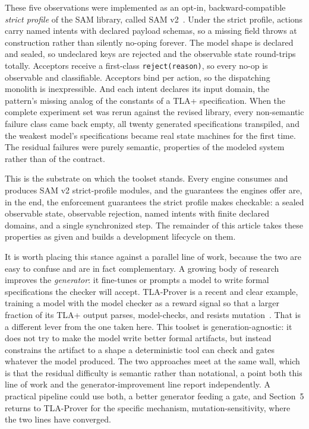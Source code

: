 \documentclass[11pt]{article}
\newcommand{\code}[1]{\texttt{#1}}
\begin{document}
These five observations were implemented as an opt-in, backward-compatible
\emph{strict profile} of the SAM library, called SAM v2~\cite{samv2}. Under
the strict profile, actions carry named intents with declared payload schemas,
so a missing field throws at construction rather than silently no-oping
forever. The model shape is declared and sealed, so undeclared keys are
rejected and the observable state round-trips totally. Acceptors receive a
first-class \code{reject(reason)}, so every no-op is observable and
classifiable. Acceptors bind per action, so the dispatching monolith is
inexpressible. And each intent declares its input domain, the pattern's
missing analog of the constants of a TLA+ specification. When the complete
experiment set was rerun against the revised library, every non-semantic
failure class came back empty, all twenty generated specifications
transpiled, and the weakest model's specifications became real state machines
for the first time. The residual failures were purely semantic, properties of
the modeled system rather than of the contract.

This is the substrate on which the toolset stands. Every engine consumes and
produces SAM v2 strict-profile modules, and the guarantees the engines offer
are, in the end, the enforcement guarantees the strict profile makes checkable:
a sealed observable state, observable rejection, named intents with finite
declared domains, and a single synchronized step. The remainder of this article
takes these properties as given and builds a development lifecycle on them.

It is worth placing this stance against a parallel line of work, because the two
are easy to confuse and are in fact complementary. A growing body of research
improves the \emph{generator}: it fine-tunes or prompts a model to write formal
specifications the checker will accept. TLA-Prover is a recent and clear example,
training a model with the model checker as a reward signal so that a larger
fraction of its TLA+ output parses, model-checks, and resists
mutation~\cite{tlaprover}. That is a different lever from the one taken here. This
toolset is generation-agnostic: it does not try to make the model write better
formal artifacts, but instead constrains the artifact to a shape a deterministic
tool can check and gates whatever the model produced. The two approaches meet at
the same wall, which is that the residual difficulty is semantic rather than
notational, a point both this line of work and the generator-improvement line
report independently. A practical pipeline could use both, a better generator
feeding a gate, and Section~5 returns to TLA-Prover for the specific mechanism,
mutation-sensitivity, where the two lines have converged.
\end{document}
